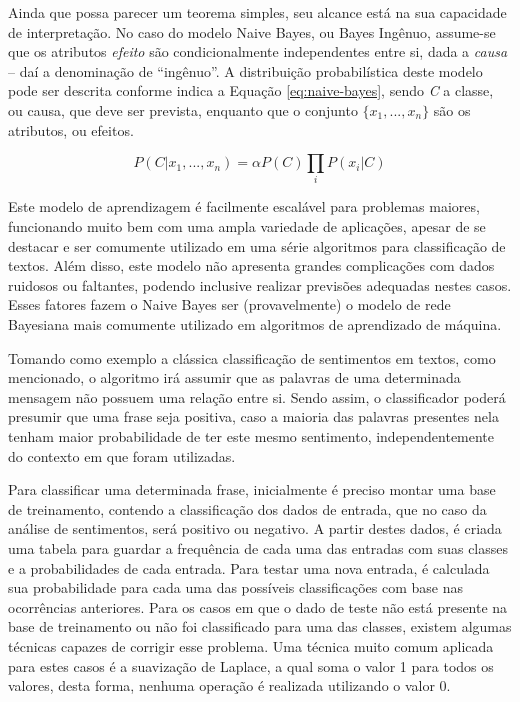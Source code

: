 \documentclass[oneside,openright,12pt]{ufsm_2015} %
\begin{document}
    \par Ainda que possa parecer um teorema simples, seu alcance está na sua capacidade de interpretação. No caso do modelo Naive Bayes, ou Bayes Ingênuo, assume-se que os atributos \textit{efeito} são condicionalmente independentes entre si, dada a \textit{causa} -- daí a denominação de ``ingênuo''. A distribuição probabilística deste modelo pode ser descrita conforme indica a Equação \ref{eq:naive-bayes}, sendo \textit{C} a classe, ou causa, que deve ser prevista, enquanto que o conjunto $\{x_1, ..., x_n\}$ são os atributos, ou efeitos.
    
    \begin{equation} \label{eq:naive-bayes}
    P(C | x_1, ..., x_n) = \alpha P(C)\prod_i{P(x_i | C)}
    \end{equation}
    
    \par Este modelo de aprendizagem é facilmente escalável para problemas maiores, funcionando muito bem com uma ampla variedade de aplicações, apesar de se destacar e ser comumente utilizado em uma série algoritmos para classificação de textos. Além disso, este modelo não apresenta grandes complicações com dados ruidosos ou faltantes, podendo inclusive realizar previsões adequadas nestes casos. Esses fatores fazem o Naive Bayes ser (provavelmente) o modelo de rede Bayesiana mais comumente utilizado em algoritmos de aprendizado de máquina.
    
    \par Tomando como exemplo a clássica classificação de sentimentos em textos, como mencionado, o algoritmo irá assumir que as palavras de uma determinada mensagem não possuem uma relação entre si. Sendo assim, o classificador poderá presumir que uma frase seja positiva, caso a maioria das palavras presentes nela tenham maior probabilidade de ter este mesmo sentimento, independentemente do contexto em que foram utilizadas.
    
    \par Para classificar uma determinada frase, inicialmente é preciso montar uma base de treinamento, contendo a classificação dos dados de entrada, que no caso da análise de sentimentos, será positivo ou negativo. A partir destes dados, é criada uma tabela para guardar a frequência de cada uma das entradas com suas classes e a probabilidades de cada entrada. Para testar uma nova entrada, é calculada sua probabilidade para cada uma das possíveis classificações com base nas ocorrências anteriores. Para os casos em que o dado de teste não está presente na base de treinamento ou não foi classificado para uma das classes, existem algumas técnicas capazes de corrigir esse problema. Uma técnica muito comum aplicada para estes casos é a suavização de Laplace, a qual soma o valor 1 para todos os valores, desta forma, nenhuma operação é realizada utilizando o valor 0.
    
\end{document}
